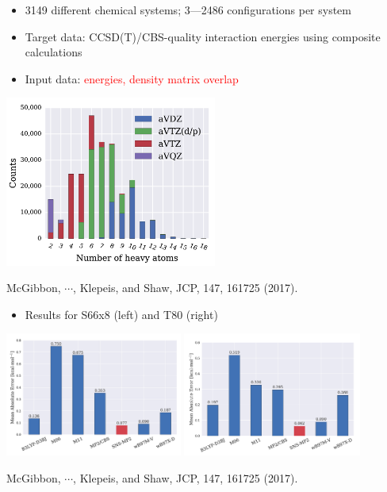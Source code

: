 \documentclass[handout]{beamer} %
\begin{document}
\begin{frame}
\begin{itemize}
\item \scriptsize{3149 different chemical systems; 3---2486 configurations per system}
\item Target data: CCSD(T)/CBS-quality interaction energies using composite calculations
\item Input data: \textcolor{red}{energies, density matrix overlap} 
\end{itemize}
\begin{center}
\includegraphics[height=2.2in]{figures_ml/Shaw_training.png}
\end{center}
\vspace{1mm}
\begin{center}
\footnotesize{McGibbon, $\cdots$, Klepeis, and Shaw, JCP, 147, 161725 (2017).}
\end{center} 
\end{frame}

\begin{frame}
\begin{itemize}
\item Results for S66x8 (left) and T80 (right) 
\end{itemize}

\begin{center}
\includegraphics[height=1.6in]{figures_ml/Shaw_S66.png}
\includegraphics[height=1.6in]{figures_ml/Shaw_T80.png}
\end{center}
\vspace{10mm}
\begin{center}
\footnotesize{McGibbon, $\cdots$, Klepeis, and Shaw, JCP, 147, 161725 (2017).}
\end{center} 
\end{frame}
\end{document}
